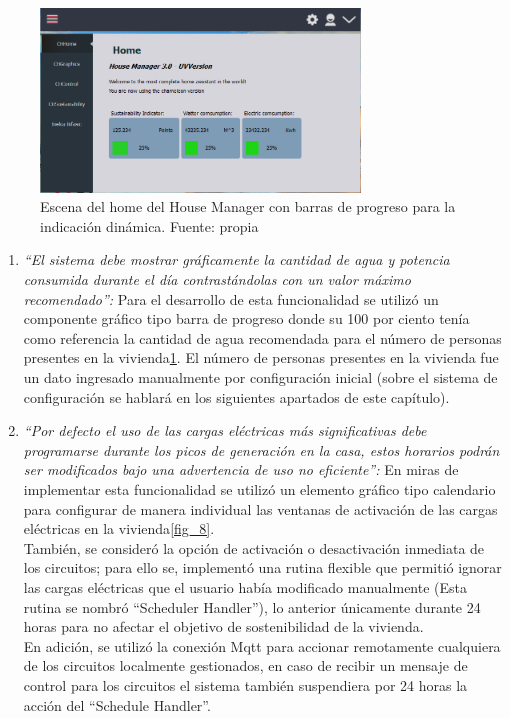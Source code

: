\begin{figure}[htbp]
	\centerline{\includegraphics[width=8.5cm]{figuras/housemanager_home.png}}
	\caption{Escena del home del House Manager con barras de progreso para la indicación dinámica. Fuente: propia}
	\label{fig_7}
\end{figure}

\begin{enumerate}
	\item \textsl{``El sistema debe mostrar gráficamente la cantidad de agua y potencia consumida durante el día contrastándolas con un valor máximo recomendado'':} Para el desarrollo de esta funcionalidad se utilizó un componente gráfico tipo barra de progreso donde su 100 por ciento tenía como referencia la cantidad de agua recomendada para el número de personas presentes en la vivienda\ref{fig_7}. El número de personas presentes en la vivienda fue un dato ingresado manualmente por configuración inicial (sobre el sistema de configuración se hablará en los siguientes apartados de este capítulo).
	
	\item \textsl{``Por defecto el uso de las cargas eléctricas más significativas debe programarse durante los picos de generación en la casa, estos horarios podrán ser modificados bajo una advertencia de uso no eficiente'':} En miras de implementar esta funcionalidad se utilizó un elemento gráfico tipo calendario para configurar de manera individual las ventanas de activación de las cargas eléctricas en la vivienda\ref{fig_8}.
	\vspace{0.5cm}\\ 
	También, se consideró la opción de activación o desactivación inmediata de los circuitos; para ello se, implementó una rutina flexible que permitió ignorar las cargas eléctricas que el usuario había modificado manualmente (Esta rutina se nombró ``Scheduler Handler''), lo anterior únicamente durante 24 horas para no afectar el objetivo de sostenibilidad de la vivienda. 
	\vspace{0.5cm}\\
	En adición, se utilizó la conexión Mqtt para accionar remotamente cualquiera de los circuitos localmente gestionados, en caso de recibir un mensaje de control para los circuitos el sistema también suspendiera por 24 horas la acción del ``Schedule Handler''.
	

\end{enumerate}
